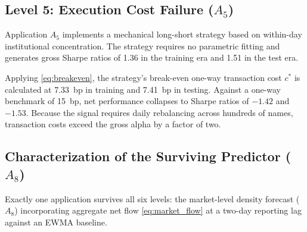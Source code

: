 \documentclass{ieeeaccess}
\begin{document}
\subsection{Level 5: Execution Cost Failure ($A_5$)}
Application $A_5$ implements a mechanical long-short strategy based on within-day institutional concentration. The strategy requires no parametric fitting and generates gross Sharpe ratios of 1.36 in the training era and 1.51 in the test era.

Applying \eqref{eq:breakeven}, the strategy's break-even one-way transaction cost $c^*$ is calculated at 7.33~bp in training and 7.41~bp in testing. Against a one-way benchmark of 15~bp, net performance collapses to Sharpe ratios of $-1.42$ and $-1.53$. Because the signal requires daily rebalancing across hundreds of names, transaction costs exceed the gross alpha by a factor of two.

\subsection{Characterization of the Surviving Predictor ($A_8$)}
Exactly one application survives all six levels: the market-level density forecast ($A_8$) incorporating aggregate net flow \eqref{eq:market_flow} at a two-day reporting lag against an EWMA baseline.
\end{document}

